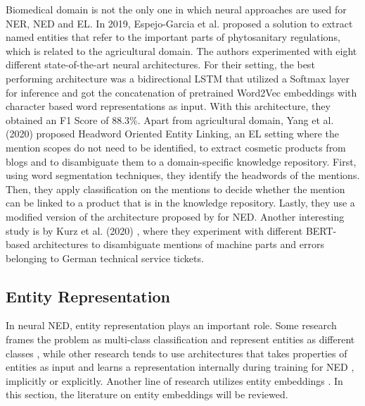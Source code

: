 \documentclass{article}
\theoremstyle{definition}
\theoremstyle{remark}
\begin{document}
Biomedical domain is not the only one in which neural approaches are used for NER, NED and EL. In 2019, Espejo-Garcia et al. \cite{agricultural} proposed a solution to extract named entities that refer to the important parts of phytosanitary regulations, which is related to the agricultural domain. The authors experimented with eight different state-of-the-art neural architectures. For their setting, the best performing architecture was a bidirectional LSTM \cite{bilstm} that utilized a Softmax layer for inference and got the concatenation of pretrained Word2Vec \cite{w2v} embeddings with character based word representations as input. With this architecture, they obtained an F1 Score of 88.3\%.  Apart from agricultural domain, Yang et al. (2020) \cite{cosmetic} proposed Headword Oriented Entity Linking, an EL setting where the mention scopes do not need to be identified, to extract cosmetic products from blogs and to disambiguate them to a domain-specific knowledge repository. First, using word segmentation techniques, they identify the headwords of the mentions. Then, they apply classification on the mentions to decide whether the mention can be linked to a product that is in the knowledge repository. Lastly, they use a modified version of the architecture proposed by \cite{gupta} for NED.  Another interesting study is by Kurz et al. (2020) \cite{TechTickets}, where they experiment with different BERT-based \cite{BERT} architectures to disambiguate mentions of machine parts and errors belonging to German technical service tickets.

\subsection{Entity Representation}
\label{entityRep}
In neural NED, entity representation plays an important role. Some research frames the problem as multi-class classification and represent entities as different classes \cite{bertEL,MedDiffArc,MedFeedback}, while other research tends to use architectures that takes properties of entities as input and learns a representation internally during training for NED \cite{scalablezeroshot}, implicitly or explicitly. Another line of research utilizes entity embeddings \cite{REL,kolitsas,dca,MedicalTriplet}. In this section, the literature on entity embeddings will be reviewed.
\end{document}
